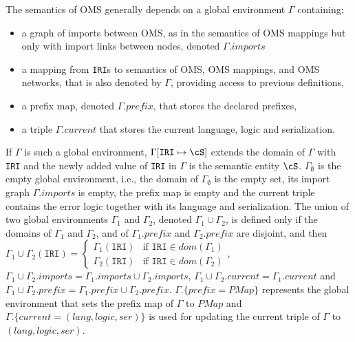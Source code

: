 \documentclass[10pt, a4paper]{isov2}
\newcommand*{\syntax}[1]{\texttt{#1}}
\newcommand{\semdom}[1]{
\begin{center}
\fbox{$#1$}
\end{center}
}
\newcommand{\prefix}{\mathit{prefix}}
\newcommand{\current}{\mathit{current}}
\newcommand{\PMap}{\mathit{PMap}}
\begin{document}
The semantics of OMS generally depends on a global environment
$\Gamma$ containing:
 \begin{itemize}
    \item a graph of imports between OMS, as in the semantics of OMS mappings but
          only with import links between nodes, denoted $\Gamma.imports$
    \item a mapping from \syntax{IRI}s to semantics of OMS, OMS mappings, and OMS networks, that
               is also denoted by $\Gamma$, providing access to previous definitions,
    \item a prefix map, denoted $\Gamma.\prefix$, that stores the declared prefixes,
    \item a triple $\Gamma.\current$ that stores the current language, logic and serialization.
 \end{itemize}

If $\Gamma$ is such a global environment, $\Gamma[\syntax{IRI} \mapsto \cS]$
extends the domain of $\Gamma$ with \syntax{IRI} and
the newly added value of \syntax{IRI} in $\Gamma$ is the semantic entity $\cS$.
 $\Gamma_\emptyset$ is the empty global environment, i.e., the domain of $\Gamma_\emptyset$ is the empty set, its import graph $\Gamma.imports$ is empty,
the prefix map is empty and the current triple contains the error logic together with its language and serialization.
The union of two global environments $\Gamma_1$ and $\Gamma_2$,
denoted $\Gamma_1\cup\Gamma_2$, is defined only if the domains of $\Gamma_1$ and $\Gamma_2$,
and of $\Gamma_1.\prefix$ and $\Gamma_2.\prefix$ are disjoint, and then
$\Gamma_1\cup\Gamma_2(\syntax{IRI}) = \begin{cases}
\Gamma_1(\syntax{IRI})& \mbox{if } \syntax{IRI} \in dom(\Gamma_1) \\
\Gamma_2(\syntax{IRI})& \mbox{if } \syntax{IRI} \in dom(\Gamma_2)
\end{cases}$,
$\Gamma_1\cup\Gamma_2.imports = \Gamma_1.imports \cup \Gamma_2.imports$,
$\Gamma_1\cup\Gamma_2.\current = \Gamma_1.\current$
and $\Gamma_1\cup\Gamma_2.\prefix = \Gamma_1.\prefix \cup \Gamma_2.\prefix$.
  $\Gamma.\{\prefix = \PMap\}$ represents the global environment that sets the prefix map of
$\Gamma$ to $\PMap$ and $\Gamma.\{\current  = (lang, logic, ser)\}$ is used for
updating the current triple of $\Gamma$ to $(lang, logic, ser)$.


\end{document}
